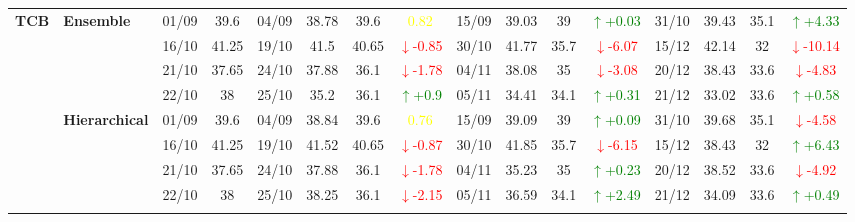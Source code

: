 \documentclass{ieeeaccess}
\begin{document}
{\begin{longtable}{llcc|cccc|cccc|cccc}
\multirow{12}{*}{\textbf{TCB}} 
& \textbf{Ensemble}
& 01/09 & 39.6 & 04/09 & 38.78 & 39.6 & \textcolor{yellow}{0.82} & 15/09 & 39.03 & 39 & \textcolor{green}{\(\uparrow\)+0.03} & 31/10 & 39.43 & 35.1 & \textcolor{green}{\(\uparrow\)+4.33} \\

&
& 16/10 & 41.25 & 19/10 & 41.5 & 40.65 & \textcolor{red}{\(\downarrow\)-0.85} & 30/10 & 41.77 & 35.7 & \textcolor{red}{\(\downarrow\)-6.07} & 15/12 & 42.14 & 32 & \textcolor{red}{\(\downarrow\)-10.14} \\

&
& 21/10 & 37.65 & 24/10 & 37.88 & 36.1 & \textcolor{red}{\(\downarrow\)-1.78} & 04/11 & 38.08 & 35 & \textcolor{red}{\(\downarrow\)-3.08} & 20/12 & 38.43 & 33.6 &\textcolor{red}{\(\downarrow\)-4.83}\\

&
& 22/10 & 38 & 25/10 & 35.2 & 36.1 & \textcolor{green}{\(\uparrow\)+0.9} & 05/11 & 34.41 & 34.1 & \textcolor{green}{\(\uparrow\)+0.31} & 21/12 & 33.02 & 33.6 & \textcolor{green}{\(\uparrow\)+0.58} \\
\cmidrule(lr){2-16}


& \textbf{Hierarchical}
& 01/09 & 39.6 & 04/09 & 38.84 & 39.6 & \textcolor{yellow}{0.76} & 15/09 & 39.09 & 39 & \textcolor{green}{\(\uparrow\)+0.09} & 31/10 & 39.68 & 35.1 & \textcolor{red}{\(\downarrow\)-4.58} \\

&
& 16/10 & 41.25 & 19/10 & 41.52 & 40.65 & \textcolor{red}{\(\downarrow\)-0.87} & 30/10 & 41.85 & 35.7 & \textcolor{red}{\(\downarrow\)-6.15} & 15/12 & 38.43 & 32 & \textcolor{green}{\(\uparrow\)+6.43} \\

&
& 21/10 & 37.65 & 24/10 & 37.88 & 36.1 & \textcolor{red}{\(\downarrow\)-1.78} & 04/11 & 35.23 & 35 & \textcolor{green}{\(\uparrow\)+0.23} & 20/12 & 38.52 & 33.6 &\textcolor{red}{\(\downarrow\)-4.92}\\

&
& 22/10 & 38 & 25/10 & 38.25 & 36.1 & \textcolor{red}{\(\downarrow\)-2.15} & 05/11 & 36.59 & 34.1 & \textcolor{green}{\(\uparrow\)+2.49} & 21/12 & 34.09 & 33.6 & \textcolor{green}{\(\uparrow\)+0.49} \\
\cmidrule(lr){2-16}




\end{longtable}}
\end{document}
